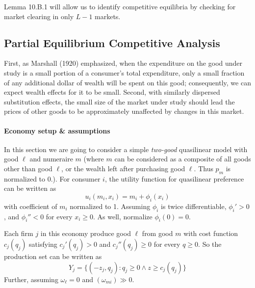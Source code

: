 \documentclass{article}
\begin{document}
	 	\begin{remark}
	 		Lemma 10.B.1 will allow us to identify competitive equilibria by checking for market clearing in only $L - 1$ markets. 
	 	\end{remark}
	 	
	 \subsection{Partial Equilibrium Competitive Analysis}
	 	\begin{remark}
	 		First, as Marshall (1920) emphasized, when the expenditure on the good under study is a small portion of a consumer's total expenditure, only a small fraction of any additional dollar of wealth will be spent on this good; consequently, we can expect wealth effects for it to be small. Second, with similarly dispersed substitution effects, the small size of the market under study should lead the prices of other goods to be approximately unaffected by changes in this market.
	 	\end{remark}
	 	
	 	\paragraph{Economy setup \& assumptions} In this section we are going to consider a simple \emph{two-good} quasilinear model with good $\ell$ and numeraire $m$ (where $m$ can be considered as a composite of all goods other than good $\ell$, or the wealth left after purchasing good $\ell$. Thus $p_m$ is normalized to $0$.). For consumer $i$, the utility function for quasilinear preference can be written as 
		 	\begin{equation}
		 		u_i (m_i, x_i) = m_i + \phi_i(x_i)
		 	\end{equation}
	 		with coefficient of $m_i$ normalized to 1. Assuming $\phi_i$ is twice differentiable, $\phi_i' > 0$, and $\phi_i'' < 0$ for every $x_i \geq 0$. As well, normalize $\phi_i(0) = 0$.
	 		\par Each firm $j$ in this economy produce good $\ell$ from good $m$ with cost function $c_j(q_j)$ satisfying $c_j'(q_j) >0$ and $c_j''(q_j) \geq 0$ for every $q \geq 0$. So the production set can be written as 
	 		\begin{equation}
	 			Y_j = \{(-z_j, q_j): q_j \geq 0 \land z \geq c_j(q_j)\}
	 		\end{equation}
	 		Further, assuming $\omega_\ell = 0$ and $(\omega_{mi}) \gg 0$.
	 		
\end{document}

